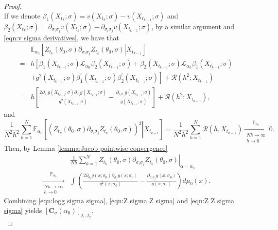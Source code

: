 \documentclass[a4paper,12pt]{article}
\numberwithin{equation}{section}
\theoremstyle{plain}
\theoremstyle{definition}
\begin{document}
\begin{appendix}
\begin{proof}
\begin{equation}
    \end{equation}
   If we denote $\beta_1(X_{t_{k}};\sigma)=v(X_{t_k};\sigma)-v(X_{t_{k-1}};\sigma)$ and $\beta_2(X_{t_k};\sigma)=\partial_{\sigma_i\sigma_j}v(X_{t_k};\sigma)-\partial_{\sigma_i\sigma_j}v(X_{t_{k-1}};\sigma)$, by a similar argument and \eqref{eqn:v sigma derivatives}, we have that
    \begin{align*}
        &\mathbb{E}_{\alpha_0}\left[\left.Z_{t_k}(\theta_0,\sigma)\partial_{\sigma_i\sigma_j}Z_{t_k}(\theta_0,\sigma)\right|X_{t_{k-1}}\right]\\
        =&h\left[\beta_1(X_{t_{k-1}};\sigma)\mathcal{L}_{\alpha_0}\beta_2(X_{t_{k-1}};\sigma)+\beta_2(X_{t_{k-1}};\sigma)\mathcal{L}_{\alpha_0}\beta_1(X_{t_{k-1}};\sigma)\right.\\
        &\left.+g^2(X_{t_{k-1}};\sigma)\beta_1^\prime(X_{t_{k-1}};\sigma)\beta_2^\prime(X_{t_{k-1}};\sigma)\right]+\mathcal{R}(h^2;X_{t_{k-1}})\\
        =&h\left[\frac{2\partial_{\sigma_i}g(X_{t_{k-1}};\sigma)\partial_{\sigma_j}g(X_{t_{k-1}};\sigma)}{g^2(X_{t_{k-1}};\sigma)}-\frac{\partial_{\sigma_i\sigma_j}g(X_{t_{k-1}};\sigma)}{g(X_{t_{k-1}};\sigma)}\right]+\mathcal{R}(h^2;X_{t_{k-1}}),
    \end{align*}
    and
    \begin{equation*}
    \frac{1}{N^2h^2}\sum_{k=1}^N\mathbb{E}_{\alpha_0}\left[ \left.\left(Z_{t_k}(\theta_0,\sigma)\partial_{\sigma_i\sigma_j}Z_{t_k}(\theta_0,\sigma)\right)^2\right| X_{t_{k-1}}\right]=\frac{1}{N^2h^2}\sum_{k=1}^N \mathcal{R}(h,X_{t_{k=1}})\xrightarrow[\substack{N h\rightarrow\infty \\ h \rightarrow 0}]{\mathbb{P}_{\alpha_0}}0.
    \end{equation*}
    Then, by Lemma \ref{lemma:Jacob pointwise convergence}
    \begin{align}\label{eqn:Z Z sigma sigma}
         &\left.\frac{1}{Nh}\sum_{k=1}^N Z_{t_{k}}(\theta_0,\sigma)\partial_{\sigma_i\sigma_j}Z_{t_{k}}(\theta_0,\sigma)\right|_{\alpha=\alpha_0}\nonumber\\
    \xrightarrow[\substack{N h\rightarrow\infty \\ h \rightarrow 0}]{\mathbb{P}_{\alpha_0}}&\int \left(\frac{2\partial_{\sigma_i}g(x;\sigma_0)\partial_{\sigma_j}g(x;\sigma_0)}{g^2(x;\sigma_0)}-\frac{\partial_{\sigma_i\sigma_j}g(x;\sigma_0)}{g(x;\sigma_0)}\right)d\mu_0(x).
    \end{align}
    Combining \eqref{eqn:logg sigma sigma}, \eqref{eqn:Z sigma Z sigma} and \eqref{eqn:Z Z sigma sigma} yields $\left[\mathbf{C}_{\sigma}(\alpha_0)\right]_{j_1,j_2}$. \\

\end{proof}
\end{appendix}
\end{document}
